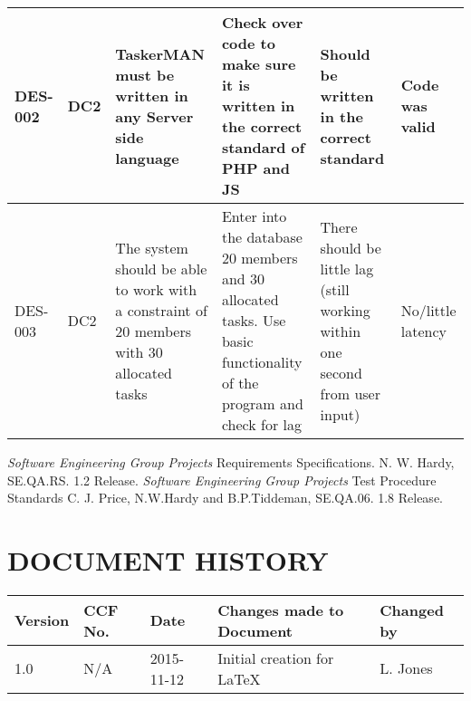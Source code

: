 \documentclass{project}
\begin{document}
\begin{longtable}{| p{2cm} | p{1.5cm} | p{2.8cm} | p{2.8cm} | p{2.8cm} | p{2.8cm} |}
\hline
DES-002 & DC2 & TaskerMAN must be written in any Server side language & Check over code to make sure it is written in the correct standard of PHP and JS & Should be written in the correct standard & Code was valid \\
\hline
DES-003 & DC2 & The system should be able to work with a constraint of 20 members with 30 allocated tasks & Enter into the database 20 members and 30 allocated tasks. Use basic functionality of the program and check for lag & There should be little lag (still working within one second from user input) & No/little latency \\
\hline
\end{longtable}
\clearpage
{}
\begin{thebibliography}{2}
 \emph{Software Engineering Group Projects}
Requirements Specifications.
N. W. Hardy, SE.QA.RS. 1.2 Release.
 \emph{Software Engineering Group Projects}
Test Procedure Standards
C. J. Price, N.W.Hardy and B.P.Tiddeman, SE.QA.06. 1.8 Release.
\end{thebibliography}
\section*{DOCUMENT HISTORY}
\begin{tabular}{|l | l | l | p{8cm} |l | }
\hline
Version & CCF No. & Date & Changes made to Document & Changed by \\
\hline
1.0 & N/A & 2015-11-12 & Initial creation for LaTeX & L. Jones \\
\hline
\end{tabular}
\label{thelastpage}
\end{document}
